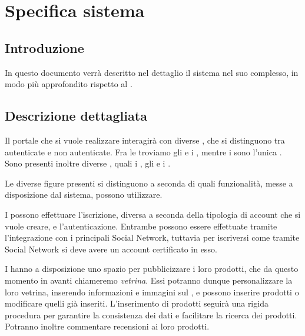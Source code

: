 \chapter{Specifica sistema} 
\label{cha:specifica_sistema}

\section{Introduzione} 
In questo documento verrà descritto nel dettaglio il sistema nel suo complesso, in modo più approfondito rispetto al .

\section{Descrizione dettagliata} 
\label{sec:descrizione_dettagliata}
Il portale che si vuole realizzare interagirà con diverse , che si distinguono tra autenticate e non autenticate. Fra le  troviamo gli  e i , mentre i  sono l'unica .
Sono presenti inoltre diverse , quali i , gli  e i .

\bigskip
\noindent
Le diverse figure presenti si distinguono a seconda di quali funzionalità, messe a disposizione dal sistema, possono utilizzare.

I  possono effettuare l'iscrizione, diversa a seconda della tipologia di account che si vuole creare, e l'autenticazione. Entrambe possono essere effettuate tramite l'integrazione con i principali Social Network, tuttavia per iscriversi come  tramite Social Network si deve avere un account certificato in esso.

I  hanno a disposizione uno spazio per pubblicizzare i loro prodotti, che da questo momento in avanti chiameremo \emph{vetrina}. Essi potranno dunque personalizzare la loro vetrina, inserendo informazioni e immagini sul , e possono inserire prodotti o modificare quelli già inseriti. L'inserimento di prodotti seguirà una rigida procedura per garantire la consistenza dei dati e facilitare la ricerca dei prodotti. Potranno inoltre commentare recensioni ai loro prodotti.

